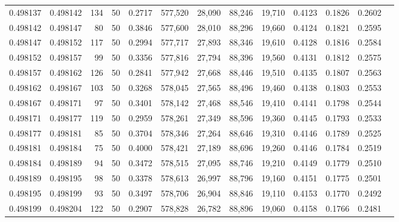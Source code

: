 \begin{tabular}{rrrrrrrrrrrrr}
0.498137 & 0.498142 &   134 &  50 &                                     0.2717 & 577,520 &  28,090 &  88,246 &  19,710 & 0.4123 & 0.1826 & 0.2602 \\
0.498142 & 0.498147 &    80 &  50 &                                     0.3846 & 577,600 &  28,010 &  88,296 &  19,660 & 0.4124 & 0.1821 & 0.2595 \\
0.498147 & 0.498152 &   117 &  50 &                                     0.2994 & 577,717 &  27,893 &  88,346 &  19,610 & 0.4128 & 0.1816 & 0.2584 \\
0.498152 & 0.498157 &    99 &  50 &                                     0.3356 & 577,816 &  27,794 &  88,396 &  19,560 & 0.4131 & 0.1812 & 0.2575 \\
0.498157 & 0.498162 &   126 &  50 &                                     0.2841 & 577,942 &  27,668 &  88,446 &  19,510 & 0.4135 & 0.1807 & 0.2563 \\
0.498162 & 0.498167 &   103 &  50 &                                     0.3268 & 578,045 &  27,565 &  88,496 &  19,460 & 0.4138 & 0.1803 & 0.2553 \\
0.498167 & 0.498171 &    97 &  50 &                                     0.3401 & 578,142 &  27,468 &  88,546 &  19,410 & 0.4141 & 0.1798 & 0.2544 \\
0.498171 & 0.498177 &   119 &  50 &                                     0.2959 & 578,261 &  27,349 &  88,596 &  19,360 & 0.4145 & 0.1793 & 0.2533 \\
0.498177 & 0.498181 &    85 &  50 &                                     0.3704 & 578,346 &  27,264 &  88,646 &  19,310 & 0.4146 & 0.1789 & 0.2525 \\
0.498181 & 0.498184 &    75 &  50 &                                     0.4000 & 578,421 &  27,189 &  88,696 &  19,260 & 0.4146 & 0.1784 & 0.2519 \\
0.498184 & 0.498189 &    94 &  50 &                                     0.3472 & 578,515 &  27,095 &  88,746 &  19,210 & 0.4149 & 0.1779 & 0.2510 \\
0.498189 & 0.498195 &    98 &  50 &                                     0.3378 & 578,613 &  26,997 &  88,796 &  19,160 & 0.4151 & 0.1775 & 0.2501 \\
0.498195 & 0.498199 &    93 &  50 &                                     0.3497 & 578,706 &  26,904 &  88,846 &  19,110 & 0.4153 & 0.1770 & 0.2492 \\
0.498199 & 0.498204 &   122 &  50 &                                     0.2907 & 578,828 &  26,782 &  88,896 &  19,060 & 0.4158 & 0.1766 & 0.2481 \\

\end{tabular}
